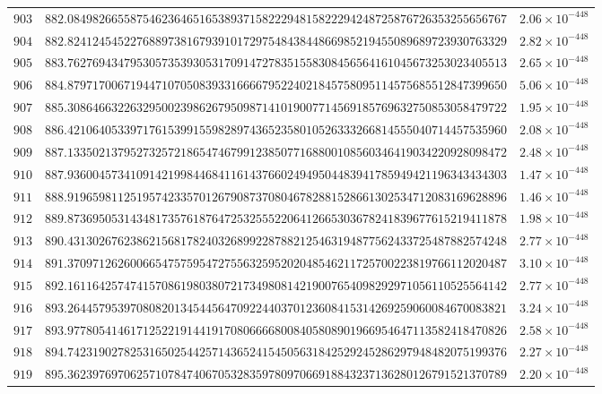 \documentclass[12pt,reqno]{amsart}
\theoremstyle{remark}
\begin{document}
\begin{longtable}{clc}
$903$ & $882.0849826655875462364651653893715822294815822294248725876726353255656767$ & $2.06\times 10^{-448}$ \\
$904$ & $882.8241245452276889738167939101729754843844866985219455089689723930763329$ & $2.82\times 10^{-448}$ \\
$905$ & $883.7627694347953057353930531709147278351558308456564161045673253023405513$ & $2.65\times 10^{-448}$ \\
$906$ & $884.8797170067194471070508393316666795224021845758095114575685512847399650$ & $5.06\times 10^{-448}$ \\
$907$ & $885.3086466322632950023986267950987141019007714569185769632750853058479722$ & $1.95\times 10^{-448}$ \\
$908$ & $886.4210640533971761539915598289743652358010526333266814555040714457535960$ & $2.08\times 10^{-448}$ \\
$909$ & $887.1335021379527325721865474679912385077168800108560346419034220928098472$ & $2.48\times 10^{-448}$ \\
$910$ & $887.9360045734109142199844684116143766024949504483941785949421196343434303$ & $1.47\times 10^{-448}$ \\
$911$ & $888.9196598112519574233570126790873708046782881528661302534712083169628896$ & $1.46\times 10^{-448}$ \\
$912$ & $889.8736950531434817357618764725325552206412665303678241839677615219411878$ & $1.98\times 10^{-448}$ \\
$913$ & $890.4313026762386215681782403268992287882125463194877562433725487882574248$ & $2.77\times 10^{-448}$ \\
$914$ & $891.3709712626006654757595472755632595202048546211725700223819766112020487$ & $3.10\times 10^{-448}$ \\
$915$ & $892.1611642574741570861980380721734980814219007654098292971056110525564142$ & $2.77\times 10^{-448}$ \\
$916$ & $893.2644579539708082013454456470922440370123608415314269259060084670083821$ & $3.24\times 10^{-448}$ \\
$917$ & $893.9778054146171252219144191708066668008405808901966954647113582418470826$ & $2.58\times 10^{-448}$ \\
$918$ & $894.7423190278253165025442571436524154505631842529245286297948482075199376$ & $2.27\times 10^{-448}$ \\
$919$ & $895.3623976970625710784740670532835978097066918843237136280126791521370789$ & $2.20\times 10^{-448}$ \\

\end{longtable}
\end{document}
